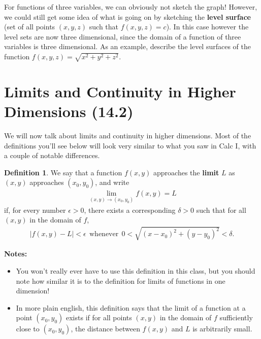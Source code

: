\documentclass[12pt, letter]{article}
\theoremstyle{plain}
\numberwithin{theorem}{section}
\theoremstyle{definition}
\newtheorem{definition}[theorem]{Definition}
\begin{document}
\bigskip

\hrulefill

\bigskip

For functions of three variables, we can obviously not sketch the graph! However, we could still get some idea of what is going on by sketching the \textbf{level surface} (set of all points $(x,y,z)$ such that $f(x,y,z) = c$). In this case however the level sets are now three dimensional, since the domain of a function of three variables is three dimensional. As an example, describe the level surfaces of the function $f(x,y,z) = \sqrt{x^2+y^2+z^2}$.

\newpage


\section{Limits and Continuity in Higher Dimensions (14.2)}

We will now talk about limits and continuity in higher dimensions. Most of the definitions you'll see below will look very similar to what you saw in Calc I, with a couple of notable differences.

\bigskip

\begin{definition}
We say that a function $f(x,y)$ approaches the \textbf{limit} $L$ as $(x,y)$ approaches $(x_0,y_0)$, and write
\begin{align*}
\lim_{(x,y) \to (x_0,y_0)} f(x,y) = L
\end{align*}
if, for every number $\epsilon > 0$, there exists a corresponding $\delta > 0$ such that for all $(x,y)$ in the domain of $f$,
\begin{align*}
|f(x,y) - L| < \epsilon \ \ \text{whenever} \ \ 0<\sqrt{(x-x_0)^2+(y-y_0)^2} < \delta.
\end{align*}
\end{definition}

\bigskip

\textbf{Notes:}
\begin{itemize}
\item You won't really ever have to use this definition in this class, but you should note how similar it is to the definition for limits of functions in one dimension!
\item In more plain english, this definition says that the limit of a function at a point $(x_0,y_0)$ exists if for all points $(x,y)$ in the domain of $f$ sufficiently close to $(x_0,y_0)$, the distance between $f(x,y)$ and $L$ is arbitrarily small.
\end{itemize}
\end{document}
